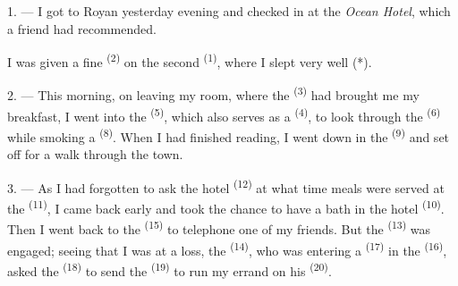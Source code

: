 %


\VUsaut{3.0mm}
\VUsaut{1.6mm}
\VUsaut{2.0mm}
\VUsaut{3.4mm}

1. --- I got to Royan yesterday evening and checked in at the \textit{Ocean Hotel}, which a
friend had recommended.

I was given a fine  \textsuperscript{(2)} on the second 
\textsuperscript{(1)}, where I slept very well (*).

2. --- This morning, on leaving my room, where the  \textsuperscript{(3)} had
brought me my breakfast, I went into the
 \textsuperscript{(5)}, which also serves as a
 \textsuperscript{(4)}, to look through the 
\textsuperscript{(6)} while smoking a  \textsuperscript{(8)}. When I had
finished reading, I went down in the  \textsuperscript{(9)} and set off for a
walk through the town.

3. --- As I had forgotten to ask the hotel  \textsuperscript{(12)} at what time
meals were served at the  \textsuperscript{(11)}, I came back early and
took the chance to have a bath in the hotel
 \textsuperscript{(10)}. Then I went back to the 
\textsuperscript{(15)} to telephone one of my friends. But the 
\textsuperscript{(13)} was engaged; seeing that I was at a loss, the
 \textsuperscript{(14)}, who was entering a  \textsuperscript{(17)} in
the  \textsuperscript{(16)}, asked the 
\textsuperscript{(18)} to send the  \textsuperscript{(19)} to run my errand
on his  \textsuperscript{(20)}.

